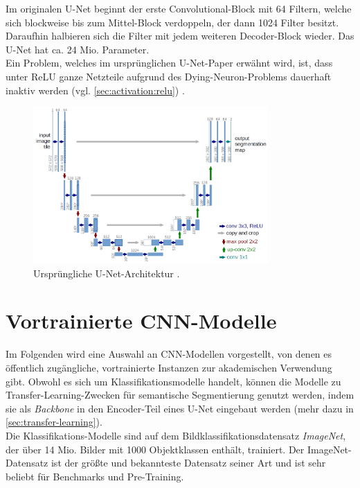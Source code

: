 Im originalen U-Net beginnt der erste Convolutional-Block mit 64 Filtern, welche
sich blockweise bis zum Mittel-Block verdoppeln, der dann 1024 Filter
besitzt. Daraufhin halbieren sich die Filter mit jedem weiteren Decoder-Block
wieder.
Das U-Net hat ca. 24 Mio. Parameter. \\
Ein Problem, welches im ursprünglichen U-Net-Paper erwähnt wird, ist, dass unter \ac{ReLU} ganze Netzteile aufgrund des Dying-Neuron-Problems dauerhaft inaktiv 
werden (vgl. \autoref{sec:activation:relu}) \cite{Ronneberger.18052015}.

\begin{figure}
	\centering
	\includegraphics[width=0.8\textwidth]{Bilder/u-net-architecture.png} 
	\caption{Ursprüngliche U-Net-Architektur \cite{Ronneberger.18052015}.}
	\label{fig:u-net-architecture}
\end{figure} 

\section{Vortrainierte \ac{CNN}-Modelle} \label{sec:pretrained-backbones}

Im Folgenden wird eine Auswahl an \ac{CNN}-Modellen vorgestellt, von denen es öffentlich zugängliche,
vortrainierte Instanzen zur akademischen Verwendung gibt. Obwohl es sich um Klassifikationsmodelle handelt,
können die Modelle zu Transfer-Learning-Zwecken für semantische Segmentierung
genutzt werden, indem sie als \textit{Backbone} in den Encoder-Teil eines U-Net eingebaut werden 
(mehr dazu in \autoref{sec:transfer-learning}). \\ 
Die Klassifikations-Modelle sind auf dem Bildklassifikationsdatensatz \textit{ImageNet}, der über 14 Mio. Bilder 
mit 1000 Objektklassen enthält, trainiert. Der ImageNet-Datensatz ist der größte und bekannteste 
Datensatz seiner Art und ist sehr beliebt für Benchmarks und Pre-Training.


